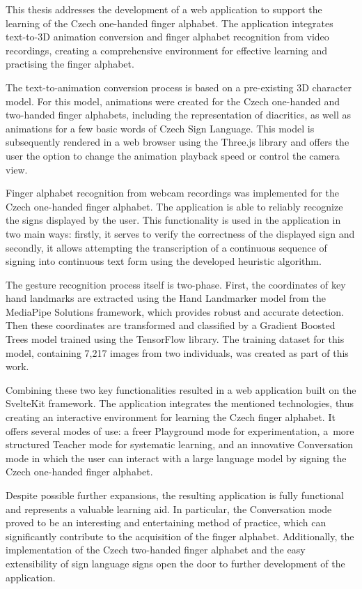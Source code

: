 \documentclass[
  master,
  program=ainfvs,
  biblatex,
  figures=true,
  tables=false,
  sourcecodes=true,
  glossaries,
  index
]{kidiplom}
\begin{document}
\begin{kiconclusions}[english]
    This thesis addresses the development of a web application to support the learning of the Czech one-handed finger alphabet. The application integrates text-to-3D animation conversion and finger alphabet recognition from video recordings, creating a comprehensive environment for effective learning and practising the finger alphabet.

    The text-to-animation conversion process is based on a pre-existing 3D character model. For this model, animations were created for the Czech one-handed and two-handed finger alphabets, including the representation of diacritics, as well as animations for a few basic words of Czech Sign Language. This model is subsequently rendered in a web browser using the Three.js library and offers the user the option to change the animation playback speed or control the camera view.
    
    Finger alphabet recognition from webcam recordings was implemented for the Czech one-handed finger alphabet. The application is able to reliably recognize the signs displayed by the user. This functionality is used in the application in two main ways: firstly, it serves to verify the correctness of the displayed sign and secondly, it allows attempting the transcription of a continuous sequence of signing into continuous text form using the developed heuristic algorithm.
    
    The gesture recognition process itself is two-phase. First, the coordinates of key hand landmarks are extracted using the Hand Landmarker model from the MediaPipe Solutions framework, which provides robust and accurate detection. Then these coordinates are transformed and classified by a Gradient Boosted Trees model trained using the TensorFlow library. The training dataset for this model, containing 7,217 images from two individuals, was created as part of this work.
    
    Combining these two key functionalities resulted in a web application built on the SvelteKit framework. The application integrates the mentioned technologies, thus creating an interactive environment for learning the Czech finger alphabet. It offers several modes of use: a freer Playground mode for experimentation, a~more structured Teacher mode for systematic learning, and an innovative Conversation mode in which the user can interact with a large language model by signing the Czech one-handed finger alphabet.
    
    Despite possible further expansions, the resulting application is fully functional and represents a valuable learning aid. In particular, the Conversation mode proved to be an interesting and entertaining method of practice, which can significantly contribute to the acquisition of the finger alphabet. Additionally, the implementation of the Czech two-handed finger alphabet and the easy extensibility of sign language signs open the door to further development of the application.
\end{kiconclusions}
\end{document}
